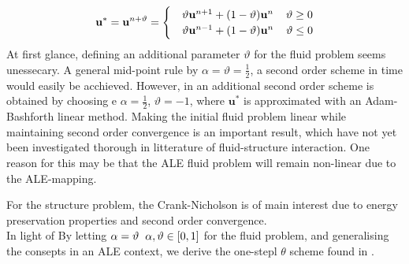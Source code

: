 \begin{align*}
\mathbf{u}^{*} =   \mathbf{u}^{n+ \vartheta} =
\begin{cases} 
   &\vartheta \mathbf{u}^{n+1} + (1 - \vartheta)\mathbf{u}^{n} \hspace{4mm} \vartheta \geq 0 \\ 
   &\vartheta \mathbf{u}^{n-1} + (1 - \vartheta)\mathbf{u}^{n} \hspace{4mm} \vartheta \leq 0
   \end{cases}
\end{align*}
At first glance, defining an additional parameter $\vartheta$ for the fluid problem seems unessecary. A general mid-point rule by  $\alpha = \vartheta = \frac{1}{2}$, a second order scheme in time would easily be acchieved. However, in \cite{Simo1994} an additional second order scheme is obtained by choosing e $\alpha = \frac{1}{2}$,  $\vartheta =-1$, where  $\mathbf{u}^{*}$ is approximated with an Adam-Bashforth linear method. Making the initial fluid problem linear while maintaining second order convergence is an important result, which have not yet been investigated thorough in litterature of fluid-structure interaction. One reason for this may be that the ALE fluid problem will remain non-linear due to the ALE-mapping.

 
For the structure problem, the Crank-Nicholson is of main interest due to energy preservation properties and second order convergence. \\


In light of By letting $\alpha = \vartheta \hspace{2mm} \alpha, \vartheta \in [0, 1] $ for the fluid problem, and generalising the consepts in an ALE context, we derive the one-stepl $\theta$ scheme found in \cite{Wicka}.


